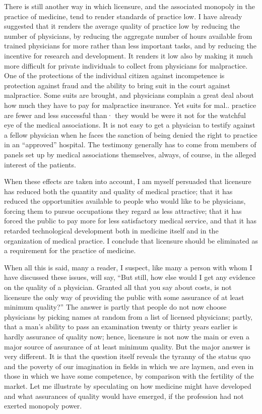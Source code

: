\documentclass[11pt,openany]{book}
\begin{document}
There is still another way in which licensure, and the associated monopoly in the practice of medicine, tend to render standards of practice low. I have already suggested that it renders the average quality of practice low by reducing the number of physicians, by reducing the aggregate number of hours available from trained physicians for more rather than less important tasks, and by reducing the incentive for research and development. It renders it low also by making it much more difficult for private individuals to collect from physicians for malpractice. One of the protections of the individual citizen against incompetence is protection against fraud and the ability to bring suit in the court against malpractice. Some suits are brought, and physicians complain a great deal about how much they have to pay for malpractice insurance. Yet suits for mal.. practice are fewer and less successful than· they would be were it not for the watchful eye of the medical associations. It is not easy to get a physician to testify against a fellow physician when he faces the sanction of being denied the right to practice in an ``approved'' hospital. The testimony generally has to come from members of panels set up by medical associations themselves, always, of course, in the alleged interest of the patients.

When these effects are taken into account, I am myself persuaded that licensure has reduced both the quantity and quality of medical practice; that it has reduced the opportunities available to people who would like to be physicians, forcing them to pursue occupations they regard as less attractive; that it has forced the public to pay more for less satisfactory medical service, and that it has retarded technological development both in medicine itself and in the organization of medical practice. I conclude that licensure should be eliminated as a requirement for the practice of medicine.

When all this is said, many a reader, I suspect, like many a person with whom I have discussed these issues, will say, ``But still, how else would I get any evidence on the quality of a physician. Granted all that you say about costs, is not licensure the only way of providing the public with some assurance of at least minimum quality?'' The answer is partly that people do not now choose physicians by picking names at random from a list of licensed physicians; partly, that a man's ability to pass an examination twenty or thirty years earlier is hardly assurance of quality now; hence, licensure is not now the main or even a major source of assurance of at least minimum quality. But the major answer is very different. It is that the question itself reveals the tyranny of the status quo and the poverty of our imagination in fields in which we are laymen, and even in those in which we have some competence, by comparison with the fertility of the market. Let me illustrate by speculating on how medicine might have developed and what assurances of quality would have emerged, if the profession had not exerted monopoly power.
\end{document}
